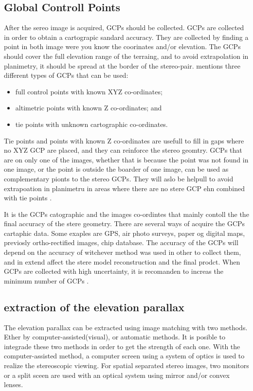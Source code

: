 \documentclass[a4paper,UKenglish]{article}
\begin{document}
\subsection{Global Controll Points}
After the sereo image is acquired, GCPs should be collected. GCPs are collected in order to obtain a cartograpic sandard accuracy. They are collected by finding a point in both image were you know the coorinates and/or elevation. The GCPs should cover the full elevation range of the terraing, and to avoid extrapolation in planimetry, it should be spread at the border of the stereo-pair. \cite{toutin01} mentions three different types of GCPs that can be used:
\begin{itemize}
\item full control points with known XYZ co-ordinates;
\item altimetric points with known Z co-ordinates; and
\item tie points with unknown cartographic co-ordinates.
\end{itemize}
Tie points and points with known Z co-ordinates are usefull to fill in gaps where no XYZ GCP are placed, and they can reinforce the stereo geomtry. GCPs that are on only one of the images, whether that is because the point was not found in one image, or the point is outside the boarder of one image, can be used as complementary pionts to the stereo GCPs. They will aslo be helpull to avoid extrapoation in planimetru in areas where there are no stere GCP ehn combined with tie points \citep{toutin01}.

It is the GCPs catographic and the images co-ordintes that mainly contoll the the final accuracy of the stere geometry. There are several ways of acquire the GCPs cartaphic data. Some exaples are GPS, air photo surveys, paper og digital maps, previosly ortho-rectified images, chip database. The accuracy of the GCPs will depend on the accuracy of witchever method was used in other to collect them, and in extend affect the stere model reconstruction and the final prodct. When GCPs are collected with high uncertainty, it is recomanden to increas the minimum number of GCPs \citep{toutin01}.

\subsection{extraction of the elevation parallax}

The elevation parallax can be extracted using image matching with two methods. Ether by computer-assisted(visual), or automatic methods. It is posible to integrade these two methods in order to get the strength of each one. With the computer-assisted method, a computer screen using a system of optics is used to realize the stereoscopic viewing. For spatial separated stereo images, two monitors or a split sceen are used with an optical system using mirror and/or convex lenses.
\end{document}
